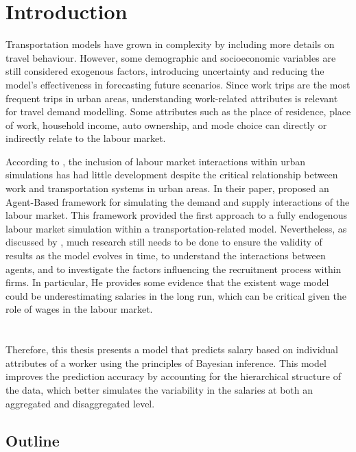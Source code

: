 \chapter{Introduction}

Transportation models have grown in complexity by including 
more details on travel behaviour. However, some demographic 
and socioeconomic variables are still considered exogenous 
factors, introducing uncertainty and reducing the model's 
effectiveness in forecasting future scenarios. Since work 
trips are the most frequent trips in urban areas, understanding 
work-related attributes is relevant for travel demand modelling. 
Some attributes such as the place of residence, place of work, 
household income, auto ownership, and mode choice can directly 
or indirectly relate to the labour market.

According to \citet{HarmonMiller2020}, the inclusion of labour 
market interactions within urban simulations has had little 
development despite the critical relationship between work and 
transportation systems in urban areas. In their paper, 
\citet{HarmonMiller2020} proposed an Agent-Based framework for 
simulating the demand and supply interactions of the labour 
market. This framework provided the first approach to a fully 
endogenous labour market simulation within a 
transportation-related model. Nevertheless, as discussed by 
\citet{Harmon2013}, much research still needs to be done to ensure 
the validity of results as the model evolves in time, to 
understand the interactions between agents, and to investigate 
the factors influencing the recruitment process within firms. 
In particular, He provides some evidence that the existent wage 
model could be underestimating salaries in the long run, which 
can be critical given the role of wages in the labour market. 
\\
\\
\\
Therefore, this thesis presents a model that predicts salary 
based on individual attributes of a worker using the principles 
of Bayesian inference. This model improves the prediction 
accuracy by accounting for the hierarchical structure of the 
data, which better simulates the variability in the salaries 
at both an aggregated and disaggregated level.

\section{Outline}

